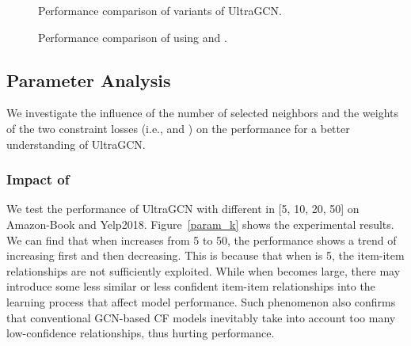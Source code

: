 \documentclass[sigconf,authorversion]{acmart}
\begin{document}
\begin{figure}[!t]
   \vspace{-2ex}
	\centering  {}
	\vspace{-2ex}
	\caption{Performance comparison of variants of UltraGCN.}
	\label{fig_ablation_study}
\end{figure}





\begin{figure}[!t]
   \vspace{-3ex}
	\centering  {}
	\vspace{-2ex}
	\caption{Performance comparison of using  and .}
	\label{fig_ablation_study_ii}
	\vspace{-2ex}
\end{figure}



\subsection{Parameter Analysis}
We investigate the influence of the number of selected neighbors  and the weights of the two constraint losses (i.e.,  and ) on the performance for a better understanding of UltraGCN.

\subsubsection{Impact of }
We test the performance of UltraGCN with different  in [5, 10, 20, 50] on Amazon-Book and Yelp2018. Figure~\ref{param_k} shows the experimental results. We can find that when  increases from 5 to 50, the performance shows a trend of increasing first and then decreasing. This is because that when  is 5, the item-item relationships are not sufficiently exploited. While when  becomes large, there may introduce some less similar or less confident item-item relationships into the learning process that affect model performance. Such phenomenon also confirms that conventional GCN-based CF models inevitably take into account too many low-confidence relationships, thus hurting performance.  
\end{document}
